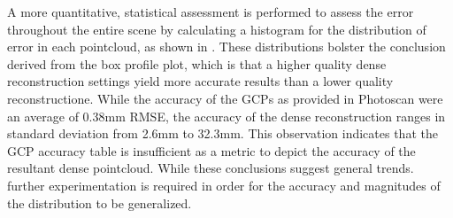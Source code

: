 

A more quantitative, statistical assessment is performed to assess the error throughout the entire scene by calculating a histogram for the distribution of error in each pointcloud, as shown in . These distributions bolster the conclusion derived from the box profile plot, which is that a higher quality dense reconstruction settings yield more accurate results than a lower quality reconstructione.  While the accuracy of the GCPs as provided in Photoscan were an average of 0.38mm RMSE, the accuracy of the dense reconstruction ranges in standard deviation from 2.6mm to 32.3mm.  This observation indicates that the GCP accuracy table is insufficient as a metric to depict the accuracy of the resultant dense pointcloud.  While these conclusions suggest general trends. further experimentation is required in order for the accuracy and magnitudes of the distribution to be generalized.




	
